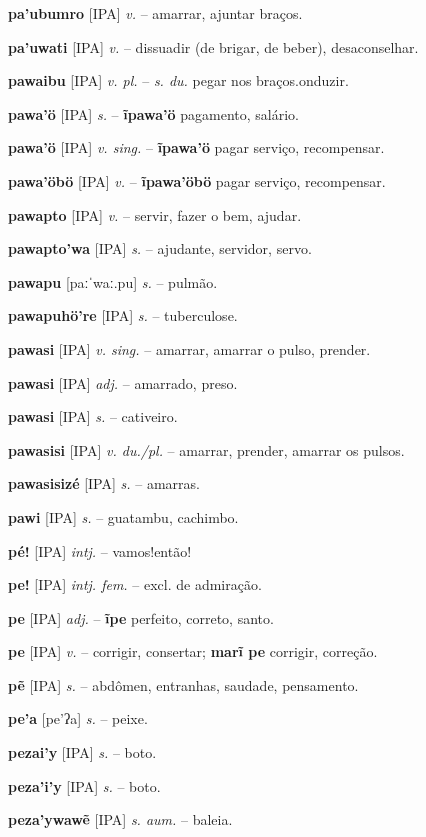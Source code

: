 \textbf{pa'ubumro} [IPA] \textit{v.} -- amarrar, ajuntar braços.

\textbf{pa'uwati} [IPA] \textit{v.} -- dissuadir (de brigar, de beber), desaconselhar.

\textbf{pawaibu} [IPA] \textit{v. pl.} -- \textit{s. du.} pegar nos braços.onduzir.

\textbf{pawa'ö} [IPA] \textit{s.} -- \textbf{ĩpawa'ö} pagamento, salário.

\textbf{pawa'ö} [IPA] \textit{v. sing.} -- \textbf{ĩpawa'ö} pagar serviço, recompensar.

\textbf{pawa'öbö} [IPA] \textit{v.} -- \textbf{ĩpawa'öbö} pagar serviço, recompensar.

\textbf{pawapto} [IPA] \textit{v.} -- servir, fazer o bem, ajudar.

\textbf{pawapto'wa} [IPA] \textit{s.} -- ajudante, servidor, servo.

\textbf{pawapu} [paːˈwaː.pu] \textit{s.} -- pulmão.

\textbf{pawapuhö're} [IPA] \textit{s.} -- tuberculose.

\textbf{pawasi} [IPA] \textit{v. sing.} -- amarrar, amarrar o pulso, prender.

\textbf{pawasi} [IPA] \textit{adj.} -- amarrado, preso.

\textbf{pawasi} [IPA] \textit{s.} -- cativeiro.

\textbf{pawasisi} [IPA] \textit{v. du./pl.} -- amarrar, prender, amarrar os pulsos.

\textbf{pawasisizé} [IPA] \textit{s.} -- amarras.

\textbf{pawi} [IPA] \textit{s.} -- guatambu, cachimbo.

\textbf{pé!} [IPA] \textit{intj.} -- vamos!então!

\textbf{pe!} [IPA] \textit{intj. fem.} -- excl. de admiração.

\textbf{pe} [IPA] \textit{adj.} -- \textbf{ĩpe} perfeito, correto, santo.

\textbf{pe} [IPA] \textit{v.} -- corrigir, consertar; \textbf{marĩ pe} corrigir, correção.

\textbf{pẽ} [IPA] \textit{s.} -- abdômen, entranhas, saudade, pensamento.

\textbf{pe'a} [pe'ʔa] \textit{s.} -- peixe.

\textbf{pezai'y} [IPA] \textit{s.} -- boto.

\textbf{peza'i'y} [IPA] \textit{s.} -- boto.

\textbf{peza'ywawẽ} [IPA] \textit{s. aum.} -- baleia.

